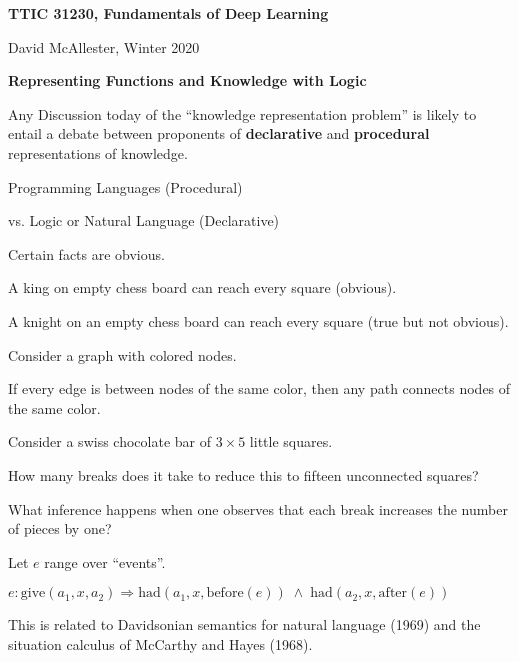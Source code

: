 




{\Huge

  \centerline{\bf TTIC 31230, Fundamentals of Deep Learning}
  \bigskip
  \centerline{David McAllester, Winter 2020}

\vfill
  \centerline{\bf Representing Functions and Knowledge with Logic}
  \vfill
  \vfill


Any Discussion today of the ``knowledge representation problem'' is likely to entail a debate between proponents of {\bf declarative} and {\bf procedural} representations of knowledge.

\vfill
{}

\vfill
Programming Languages (Procedural)

\vfill
vs. Logic or Natural Language (Declarative)


Certain facts are obvious.

\vfill
A king on empty chess board can reach every square (obvious).

\vfill
A knight on an empty chess board can reach every square (true but not obvious).


Consider a graph with colored nodes.

\vfill
If every edge is between nodes of the same color, then any path connects nodes of the same color.

\vfill
Consider a swiss chocolate bar of $3 \times 5$ little squares.

\vfill
How many breaks does it take to reduce this to fifteen unconnected squares?

\vfill
What inference happens when one observes that each break increases the number of pieces by one?


Let $e$ range over ``events''.

\vfill
$e:\mathrm{give}(a_1,x,a_2) \Rightarrow \mathrm{had}(a_1,x,\mathrm{before}(e)) \;\wedge\; \mathrm{had}(a_2,x,\mathrm{after}(e))$

\vfill
This is related to Davidsonian semantics for natural language (1969) and the situation calculus of McCarthy and Hayes (1968).


}
